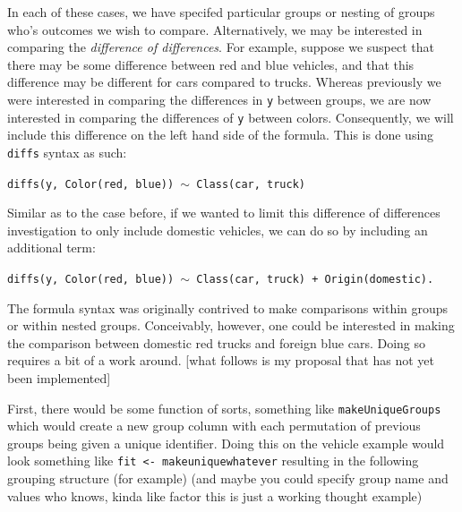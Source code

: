 \documentclass{article}
\newcommand{\xt}{\texttt}%
\begin{document}
In each of these cases, we have specifed particular groups or nesting of groups who's outcomes we wish to compare. Alternatively, we may be interested in comparing the \textit{difference of differences}. For example, suppose we suspect that there may be some difference between red and blue vehicles, and that this difference may be different for cars compared to trucks. Whereas previously we were interested in comparing the differences in \xt{y} between groups, we are now interested in comparing the differences of \xt{y} between colors. Consequently, we will include this difference on the left hand side of the formula. This is done using \xt{diffs} syntax as such:

\begin{center}
\tt diffs(y, Color(red, blue)) $\sim$ Class(car, truck)
\end{center}

Similar as to the case before, if we wanted to limit this difference of differences investigation to only include domestic vehicles, we can do so by including an additional term:

\begin{center}
\tt diffs(y, Color(red, blue)) $\sim$ Class(car, truck) + Origin(domestic).
\end{center}

The formula syntax was originally contrived to make comparisons within groups or within nested groups. Conceivably, however, one could be interested in making the comparison between domestic red trucks and foreign blue cars. Doing so requires a bit of a work around. [what follows is my proposal that has not yet been implemented]

First, there would be some function of sorts, something like \xt{makeUniqueGroups} which would create a new group column with each permutation of previous groups being given a unique identifier. Doing this on the vehicle example would look something like \xt{fit <- makeuniquewhatever} resulting in the following grouping structure (for example) (and maybe you could specify group name and values who knows, kinda like factor this is just a working thought example)
\end{document}
